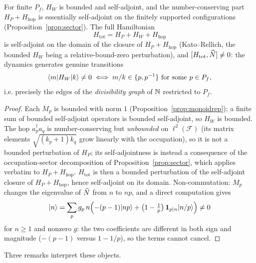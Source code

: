 \begin{proposition}\label{prop:wellposed}
For finite $P_{f}$, $H_{W}$ is bounded and self-adjoint, and the number-conserving part
$H_{P}+H_{\mathrm{hop}}$ is essentially self-adjoint on the finitely supported configurations
(Proposition~\ref{prop:sector}). The full Hamiltonian
\begin{equation}\label{eq:fullH}
H_{\mathrm{tot}}=H_{P}+H_{W}+H_{\mathrm{hop}}
\end{equation}
is self-adjoint on the domain of the closure of $H_{P}+H_{\mathrm{hop}}$ (Kato--Rellich, the
bounded $H_{W}$ being a relative-bound-zero perturbation), and
$[H_{\mathrm{tot}},\widehat{N}]\neq0$: the dynamics generates genuine transitions
\begin{equation}
\langle m\rvert H_{W}\lvert k\rangle\neq 0 \iff m/k\in\{p,p^{-1}\}\ \text{for some }p\in P_{f},
\end{equation}
i.e. precisely the edges of the \emph{divisibility graph} of $\mathbb{N}$ restricted to $P_{f}$.
\end{proposition}

\begin{proof}
Each $M_{p}$ is bounded with norm $1$ (Proposition~\ref{prop:monoidrep}); a finite sum of
bounded self-adjoint operators is bounded self-adjoint, so $H_{W}$ is bounded. The hop
$a_{p}^{\dagger}a_{q}$ is number-conserving but \emph{unbounded} on $\ell^{2}(\mathcal{F})$ (its
matrix elements $\sqrt{(k_{p}+1)k_{q}}$ grow linearly with the occupation), so it is not a
bounded perturbation of $H_{P}$; its self-adjointness is instead a consequence of the
occupation-sector decomposition of Proposition~\ref{prop:sector}, which applies verbatim to
$H_{P}+H_{\mathrm{hop}}$. $H_{\mathrm{tot}}$ is then a bounded perturbation of the self-adjoint
closure of $H_{P}+H_{\mathrm{hop}}$, hence self-adjoint on its domain. Non-commutation:
$M_{p}$ changes the eigenvalue of $\widehat{N}$ from $n$ to $np$, and a direct computation gives
\begin{equation}
[H_{W},\Nhat]\ket{n}=\sum_{p}g_{p}\,n\Bigl(-(p-1)\ket{np}+\bigl(1-\tfrac{1}{p}\bigr)\,\mathbf{1}_{p\mid n}\ket{n/p}\Bigr)\neq0
\end{equation}
for $n\geq1$ and nonzero $g$: the two coefficients are different in both sign and magnitude
($-(p-1)$ versus $1-1/p$), so the terms cannot cancel.
\end{proof}

Three remarks interpret these objects.

